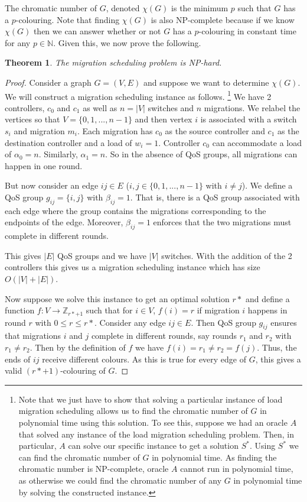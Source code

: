 \documentclass[conference]{IEEEtran}
\newtheorem{theorem}{Theorem}
\begin{document}
The chromatic number of $G$, denoted $\chi(G)$ is the minimum $p$ such that $G$ has a $p$-colouring. Note that finding $\chi(G)$ is also NP-complete because if we know $\chi(G)$ then we can answer whether or not $G$ has a $p$-colouring in constant time for any $p \in \mathbb{N}$. Given this, we now prove the following.

\begin{theorem}
    The migration scheduling problem is NP-hard.
\end{theorem}
\begin{proof}
    Consider a graph $G = (V, E)$ and suppose we want to determine $\chi(G)$. We will construct a migration scheduling instance as follows. \footnote{Note that we just have to show that solving a particular instance of load migration scheduling allows us to find the chromatic number of $G$ in polynomial time using this solution. To see this, suppose we had an oracle $A$ that solved any instance of the load migration scheduling problem. Then, in particular, $A$ can solve our specific instance to get a solution $S^{*}$. Using $S^{*}$ we can find the chromatic number of $G$ in polynomial time. As finding the chromatic number is NP-complete, oracle $A$ cannot run in polynomial time, as otherwise we could find the chromatic number of any $G$ in polynomial time by solving the constructed instance.} We have 2 controllers, $c_{0}$ and $c_{1}$ as well as $n = |V|$ switches and $n$ migrations. We relabel the vertices so that $V = \{0, 1, ..., n-1\}$ and then vertex $i$ is associated with a switch $s_{i}$ and migration $m_{i}$. Each migration has $c_{0}$ as the source controller and $c_{1}$ as the destination controller and a load of $w_{i} = 1$. Controller $c_{0}$ can accommodate a load of $\alpha_{0} = n$. Similarly, $\alpha_{1} = n$. So in the absence of QoS groups, all migrations can happen in one round.
    
    But now consider an edge $ij \in E$ ($i, j \in \{0, 1, ..., n - 1\}$ with $i \neq j$). We define a QoS group $g_{ij} = \{i, j\}$ with $\beta_{ij} = 1$. That is, there is a QoS group associated with each edge where the group contains the migrations corresponding to the endpoints of the edge. Moreover, $\beta_{ij} = 1$ enforces that the two migrations must complete in different rounds.
    
    This gives $|E|$ QoS groups and we have $|V|$ switches. With the addition of the 2 controllers this gives us a migration scheduling instance which has size $O(|V| + |E|)$.
    
    Now suppose we solve this instance to get an optimal solution $r*$ and define a function $f: V \rightarrow \mathbb{Z}_{r* + 1}$ such that for $i \in V$, $f(i) = r$ if migration $i$ happens in round $r$ with $0 \leq r \leq r*$. Consider any edge $ij \in E$. Then QoS group $g_{ij}$ ensures that migrations $i$ and $j$ complete in different rounds, say rounds $r_{1}$ and $r_{2}$ with $r_{1} \neq r_{2}$. Then by the definition of $f$ we have $f(i) = r_{1} \neq r_{2} = f(j)$. Thus, the ends of $ij$ receive different colours. As this is true for every edge of $G$, this gives a valid $(r* + 1)$-colouring of $G$.
    

\end{proof}
\end{document}
